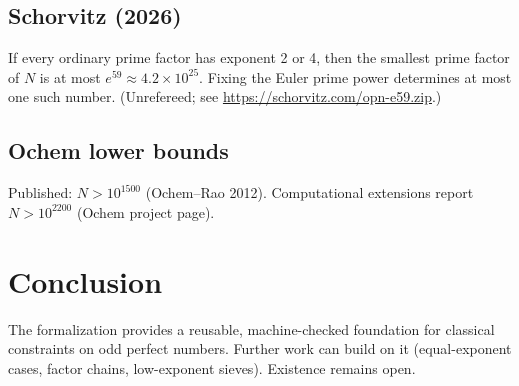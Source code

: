 \documentclass[11pt,a4paper]{article}
\begin{document}
\subsection{Schorvitz (2026)}
If every ordinary prime factor has exponent 2 or 4, then the smallest prime factor of $N$ is at most $e^{59} \approx 4.2 \times 10^{25}$. Fixing the Euler prime power determines at most one such number. (Unrefereed; see \url{https://schorvitz.com/opn-e59.zip}.)

\subsection{Ochem lower bounds}
Published: $N > 10^{1500}$ (Ochem--Rao 2012). Computational extensions report $N > 10^{2200}$ (Ochem project page).

\section{Conclusion}
The formalization provides a reusable, machine-checked foundation for classical constraints on odd perfect numbers. Further work can build on it (equal-exponent cases, factor chains, low-exponent sieves). Existence remains open.
\end{document}
